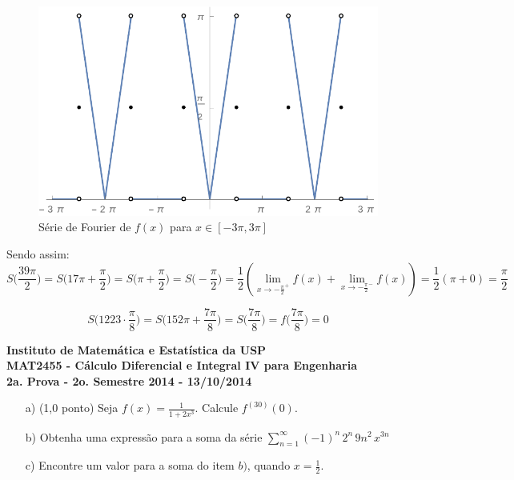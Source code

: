 \documentclass[12pt,a4paper]{article}
\begin{document}
\begin{itemize}
\begin{figure}[H]
	\centering
	\includegraphics[scale=0.7]{Fourier.pdf}  
	\caption{Série de Fourier de $f(x)$ para $x \in [-3\pi, 3\pi]$}
	\label{fig:figura1}
\end{figure}

Sendo assim:
$$ S\Big(\frac{39 \pi}{2}\Big) = S\Big(17\pi + \frac{\pi}{2}\Big) = S\Big(\pi + \frac{\pi}{2}\Big) = S\Big(- \frac{\pi}{2}\Big) = \frac{1}{2} ( \lim_{x \rightarrow - \frac{\pi}{2}^+ } f(x) + \lim_{x \rightarrow - \frac{\pi}{2}^- } f(x) ) = \frac{1}{2} ( \pi + 0) = \frac{\pi}{2} $$

$$ S\Big(1223 \cdot \frac{\pi}{8}\Big) = S\Big(152\pi + \frac{7 \pi}{8}\Big) = S\Big(\frac{7\pi}{8}\Big) = f\Big(\frac{7\pi}{8}\Big) = 0 $$

\end{itemize}

\newpage
\begin{center}
\textbf{Instituto de Matemática e Estatística da USP\\
MAT2455 - Cálculo Diferencial e Integral IV para Engenharia\\}
\textbf{2a. Prova - 2o. Semestre 2014 - 13/10/2014}
\end{center}


\begin{itemize}
	\item[a)] (1,0 ponto) Seja $ f(x) = \displaystyle\frac{1}{1+2x^3}$. Calcule $f^{(30)}(0)$.
	
	\item[b)] Obtenha uma expressão para a soma da série $\displaystyle\sum_{n=1}^\infty (-1)^n \, 2^n \, 9 n^2 \, x^{3n}$ 
	\item[c)] Encontre um valor para a soma do item $b)$, quando $x = \displaystyle\frac{1}{2}$.
\end{itemize}
\end{document}
